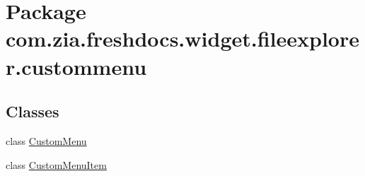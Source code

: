 \hypertarget{namespacecom_1_1zia_1_1freshdocs_1_1widget_1_1fileexplorer_1_1custommenu}{\section{Package com.\-zia.\-freshdocs.\-widget.\-fileexplorer.\-custommenu}
\label{namespacecom_1_1zia_1_1freshdocs_1_1widget_1_1fileexplorer_1_1custommenu}
}
\subsection*{Classes}
\begin{DoxyCompactItemize}
\item 
class \hyperlink{classcom_1_1zia_1_1freshdocs_1_1widget_1_1fileexplorer_1_1custommenu_1_1_custom_menu}{Custom\-Menu}
\item 
class \hyperlink{classcom_1_1zia_1_1freshdocs_1_1widget_1_1fileexplorer_1_1custommenu_1_1_custom_menu_item}{Custom\-Menu\-Item}
\end{DoxyCompactItemize}
